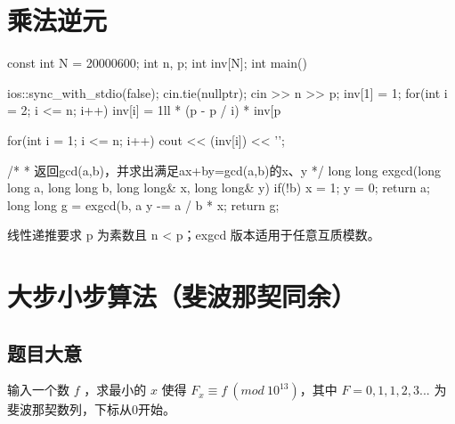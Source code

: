 \section{乘法逆元}
\begin{codeline}
const int N = 20000600;
int n, p;
int inv[N];
int main() {
    ios::sync_with_stdio(false);
    cin.tie(nullptr);
    cin >> n >> p;
    inv[1] = 1;
    for(int i = 2; i <= n; i++) {
        inv[i] = 1ll * (p - p / i) * inv[p %
    }

    for(int i = 1; i <= n; i++) {
        cout << (inv[i]) << '\n';
    }
}
\end{codeline}
\begin{codeline}
/*
 * 返回gcd(a,b)，并求出满足ax+by=gcd(a,b)的x、y
 */
long long exgcd(long long a, long long b, long long& x, long long& y) {
    if(!b) {
        x = 1;
        y = 0;
        return a;
    }
    long long g = exgcd(b, a %
    y -= a / b * x;
    return g;
}
\end{codeline}
\begin{warnbox}
线性递推要求 p 为素数且 n < p；exgcd 版本适用于任意互质模数。
\end{warnbox}

\section{大步小步算法（斐波那契同余）}
\subsection{题目大意}\label{ux9898ux76eeux5927ux610f}

输入一个数 \(f\) ，求最小的 \(x\) 使得 \(F_x \equiv f \  (mod \  10^{13})\)，其中 \(F = {0, 1, 1, 2, 3 ...}\) 为斐波那契数列，下标从0开始。


